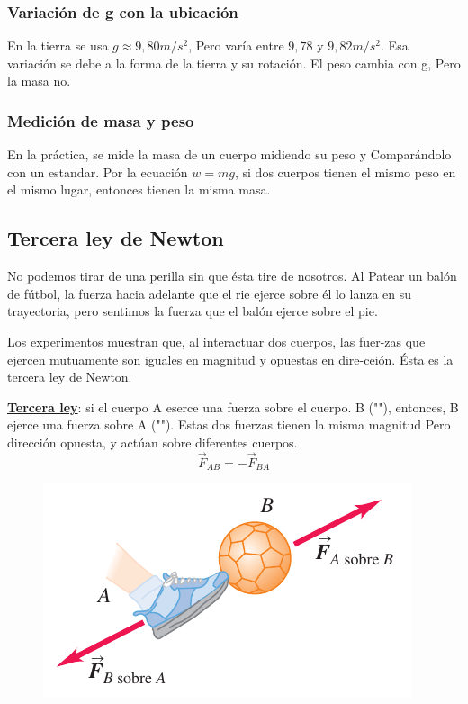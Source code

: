 \documentclass{article}
\newcommand{\newsubsection}[1]{
    \vspace{0.5cm}
    \color{sectionColor}
    \subsection{\bl{#1}}
    \color{black}
    \vspace{0.5cm}
}
\newcommand{\newtitle}[1]{
    \color{titleColor}
    \subsubsection{#1}
    \color{black}
}
\newcommand{\bl}[1]{\textbf{#1}}
\newcommand{\definicion}[1]{%
    \vspace{0.5cm}
    \begin{definicionbox}
        #1
    \end{definicionbox}
    \vspace{0.5cm}
}
\begin{document}
    \newtitle{Variación de g con la ubicación}

    \par En la tierra se usa $g \approx 9,80 m/s^2$, Pero varía entre $9,78$ y $9,82 m/s^2$. Esa variación se debe a la forma de la tierra y su rotación. El peso cambia con g, Pero la masa no.

    \vspace{3cm}

    \newtitle{Medición de masa y peso}

    \par En la práctica, se mide la masa de un cuerpo midiendo su peso y Comparándolo con un estandar. Por la ecuación $w=mg$, si dos cuerpos tienen el mismo peso en el mismo lugar, entonces tienen la misma masa.

    \newsubsection{Tercera ley de Newton}

    \par No podemos tirar de una perilla sin que ésta tire de nosotros. Al Patear un balón de fútbol, la fuerza hacia adelante que el rie ejerce sobre él lo lanza en su trayectoria, pero sentimos la fuerza que el balón ejerce sobre el pie.
    \par Los experimentos muestran que, al interactuar dos cuerpos, las fuer-zas que ejercen mutuamente son iguales en magnitud y opuestas en dire-ceión. Ésta es la tercera ley de Newton.

    \definicion{
        \par \color{blue}\underline{\bl{Tercera ley}}\color{black}: si el cuerpo A eserce una fuerza sobre el cuerpo. B ("\text{acción}"), entonces, B ejerce una fuerza sobre A ("\text{reacción}"). Estas dos fuerzas tienen la misma magnitud Pero dirección opuesta, y actúan sobre diferentes cuerpos.
        \[\vec{F}_{AB} = - \vec{F}_{BA}\]
    }

    \begin{figure}[H]
        \centering
        \includegraphics[scale=0.8]{img/2.5-1.png}
    \end{figure}
\end{document}

